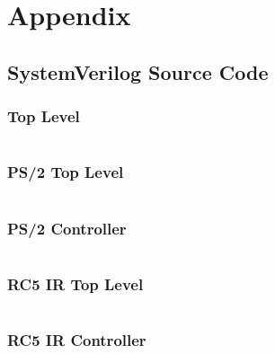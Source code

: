 \documentclass[12pt]{article}
\numberwithin{figure}{subsection}
\begin{document}
\section{Appendix}

\subsection{SystemVerilog Source Code}

\subsubsection{Top Level}

\inputminted[breaklines, fontfamily=tt, fontsize=\small, frame=lines, framesep=1.5em, linenos, numbersep=1.5em, style=vs]{systemverilog}{../src/top_level.sv}

\subsubsection{PS/2 Top Level}

\inputminted[breaklines, fontfamily=tt, fontsize=\small, frame=lines, framesep=1.5em, linenos, numbersep=1.5em, style=vs]{systemverilog}{../src/ps2_top_level.sv}

\subsubsection{PS/2 Controller}

\inputminted[breaklines, fontfamily=tt, fontsize=\small, frame=lines, framesep=1.5em, linenos, numbersep=1.5em, style=vs]{systemverilog}{../src/ps2.sv}

\subsubsection{RC5 IR Top Level}

\inputminted[breaklines, fontfamily=tt, fontsize=\small, frame=lines, framesep=1.5em, linenos, numbersep=1.5em, style=vs]{systemverilog}{../src/ir_top_level.sv}

\subsubsection{RC5 IR Controller}

\inputminted[breaklines, fontfamily=tt, fontsize=\small, frame=lines, framesep=1.5em, linenos, numbersep=1.5em, style=vs]{systemverilog}{../src/ir.sv}
\end{document}
